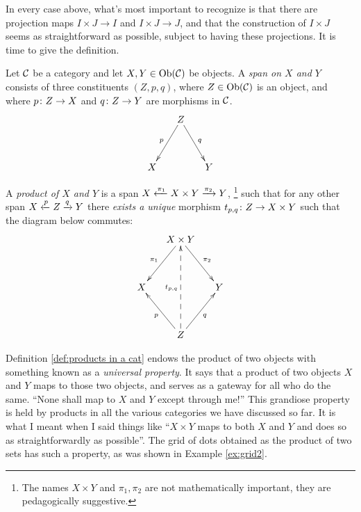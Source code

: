 In every case above, what's most important to recognize is that there are projection maps $I\times J\to I$ and $I\times J\to J$, and that the construction of $I\times J$ seems as straightforward as possible, subject to having these projections. It is time to give the definition.

\begin{definition}\label{def:products in a cat}

Let $\mathcal{C}$ be a category and let $X,Y\in\textnormal{Ob}(\mathcal{C})$ be objects. A {\em span on $X$ and $Y$} consists of three constituents $(Z,p,q)$, where $Z\in\textnormal{Ob}(\mathcal{C})$ is an object, and where $p\colon Z\rightarrow X$ and $q\colon Z\rightarrow Y$ are morphisms in $\mathcal{C}$. 
$$\xymatrix@=15pt{&Z\ar[ldd]_p\ar[rdd]^q\\\\X&&Y}$$   

A {\em product of $X$ and $Y$} is a span $X\xleftarrow{\pi_1}X\times Y\xrightarrow{\pi_2}Y$, \footnote{The names $X\times Y$ and $\pi_1,\pi_2$ are not mathematically important, they are pedagogically suggestive.} such that for any other span $X\xleftarrow{p}Z\xrightarrow{q}Y$ there {\em exists a unique} morphism $t_{p,q}\colon Z\rightarrow X\times Y$ such that the diagram below commutes:
$$
\xymatrix@=15pt{&X\times Y\ar[ldd]_{\pi_1}\ar[rdd]^{\pi_2}\\\\X&&Y\\\\&Z\ar[uul]^{p}\ar[uur]_q\ar@{-->}[uuuu]^{t_{p,q}}}
$$
\end{definition}

\begin{remark}\label{rem:gateway}

Definition \ref{def:products in a cat} endows the product of two objects with something known as a {\em universal property}. It says that a product of two objects $X$ and $Y$ maps to those two objects, and serves as a gateway for all who do the same. “None shall map to $X$ and $Y$ except through me!” This grandiose property is held by  products in all the various categories we have discussed so far. It is what I meant when I said things like “$X\times Y$ maps to both $X$ and $Y$ and does so as straightforwardly as possible”.  The grid of dots obtained as the product of two sets has such a property, as was shown in Example \ref{ex:grid2}.

\end{remark}

